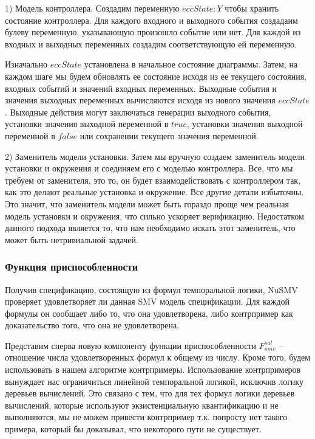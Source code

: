 \documentclass[14pt]{extarticle}
\theoremstyle{plain}
\theoremstyle{definition}
\begin{document}
1) Модель контроллера. Создадим переменную $eccState : Y$ чтобы хранить
состояние контроллера. Для каждого входного и выходного события создадаим
булеву переменную, указывающую произошло событие или нет. Для каждой из
входных и выходных переменных создадим соответствующую ей переменную.

Изначально $eccState$ установлена в начальное состояние диаграммы. Затем, на
каждом шаге мы будем обновлять ее состояние исходя из ее текущего состояния,
входных событий и значений входных переменных. Выходные события и значения
выходных переменных вычисляются исходя из нового значения $eccState$. Выходные
действия могут заключаться генерации выходного события, установки значения
выходной переменной в $true$, установки значения выходной переменной в $false$
или сохранении текущего значения переменной.

2) Заменитель модели установки. Затем мы вручную создаем заменитель модели
установки и окружения и соединяем его с моделью контроллера. Все, что мы
требуем от заменителя, это то, он будет взаимодействовать с контроллером так,
как это делают реальные установка и окружение. Все другие детали избыточны. Это
значит, что заменитель модели может быть гораздо проще чем реальная модель
установки и окружения, что сильно ускоряет верификацию. Недостатком данного
подхода является то, что нам необходимо искать этот заменитель, что может быть
нетривиальной задачей.

\subsubsection{Функция приспособленности}

Получив спецификацию, состоящую из формул темпоральной логики, NuSMV проверяет
удовлетворяет ли данная SMV модель спецификации. Для каждой формулы он сообщает
либо то, что она удовлетворена, либо контрпример как доказательство того, что
она не удовлетворена.

Представим сперва новую компоненту функции приспособленности $F^{sat}_{smv}$ --
отношение числа удовлетворенных формул к общему из числу. Кроме того, будем
использовать в нашем алгоритме контрпримеры. Использование контрпримеров
вынуждает нас ограничиться линейной темпоральной логикой, исключив логику
деревьев вычислений. Это связано с тем, что для тех формул логики деревьев
вычислений, которые используют экзистенциальную квантификацию и не выполняются,
мы не можем привести контрпример т.к. попросту нет такого примера, который бы
доказывал, что некоторого пути не существует.
\end{document}
